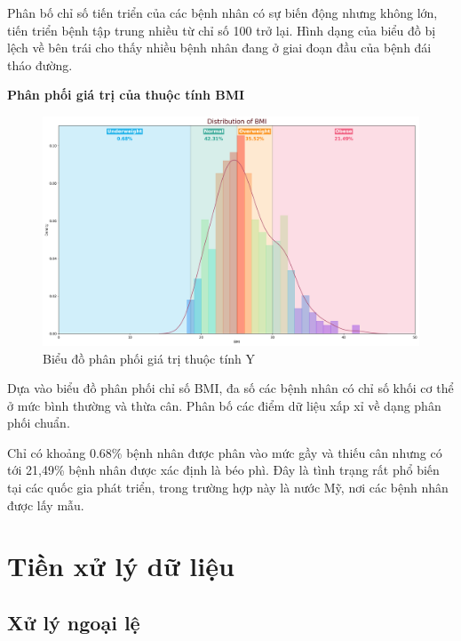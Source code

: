 \documentclass[runningheads]{llncs}
\begin{document}
Phân bố chỉ số tiến triển của các bệnh nhân có sự biến động nhưng không lớn, tiến triển bệnh tập trung nhiều từ chỉ số 100 trở lại. Hình dạng của biểu đồ bị lệch về bên trái cho thấy nhiều bệnh nhân đang ở giai đoạn đầu của bệnh đái tháo đường.


\vspace{0.5cm}
\textbf{Phân phối giá trị của thuộc tính BMI}

\begin{figure}[H]
\centering
\includegraphics[width=\textwidth]{Dist_BMI}
\caption{Biểu đồ phân phối giá trị thuộc tính Y} \label{fig2}
\end{figure}

Dựa vào biểu đồ phân phối chỉ số BMI, đa số các bệnh nhân có chỉ số khối cơ thể ở mức bình thường và thừa cân. Phân bố các điểm dữ liệu xấp xỉ về dạng phân phối chuẩn.

Chỉ có khoảng 0.68\% bệnh nhân được phân vào mức gầy và thiếu cân nhưng có tới 21,49\% bệnh nhân được xác định là béo phì. Đây là tình trạng rất phổ biến tại các quốc gia phát triển, trong trường hợp này là nước Mỹ, nơi các bệnh nhân được lấy mẫu.


\pagebreak
\section{Tiền xử lý dữ liệu}
\subsection{Xử lý ngoại lệ}
\end{document}
